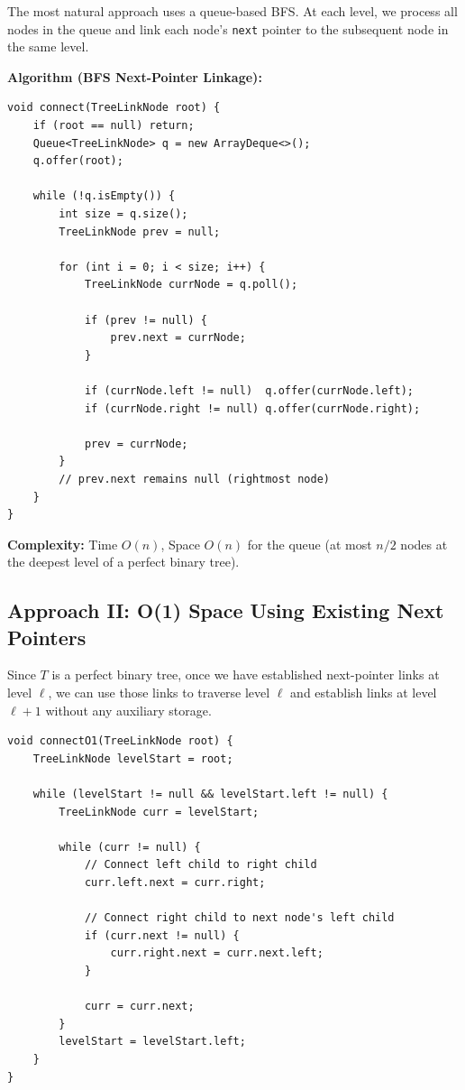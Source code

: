\documentclass[10pt,journal,compsoc,onecolumn]{IEEEtran}
\begin{document}
The most natural approach uses a queue-based BFS. At each level, we process all nodes in the queue and link each node's \texttt{next} pointer to the subsequent node in the same level.

\textbf{Algorithm (BFS Next-Pointer Linkage):}

\begin{verbatim}
void connect(TreeLinkNode root) {
    if (root == null) return;
    Queue<TreeLinkNode> q = new ArrayDeque<>();
    q.offer(root);

    while (!q.isEmpty()) {
        int size = q.size();
        TreeLinkNode prev = null;

        for (int i = 0; i < size; i++) {
            TreeLinkNode currNode = q.poll();

            if (prev != null) {
                prev.next = currNode;
            }

            if (currNode.left != null)  q.offer(currNode.left);
            if (currNode.right != null) q.offer(currNode.right);

            prev = currNode;
        }
        // prev.next remains null (rightmost node)
    }
}
\end{verbatim}

\textbf{Complexity:} Time $O(n)$, Space $O(n)$ for the queue (at most $n/2$ nodes at the deepest level of a perfect binary tree).

\subsection{Approach II: O(1) Space Using Existing Next Pointers}

Since $T$ is a perfect binary tree, once we have established next-pointer links at level $\ell$, we can use those links to traverse level $\ell$ and establish links at level $\ell + 1$ without any auxiliary storage.

\begin{verbatim}
void connectO1(TreeLinkNode root) {
    TreeLinkNode levelStart = root;

    while (levelStart != null && levelStart.left != null) {
        TreeLinkNode curr = levelStart;

        while (curr != null) {
            // Connect left child to right child
            curr.left.next = curr.right;

            // Connect right child to next node's left child
            if (curr.next != null) {
                curr.right.next = curr.next.left;
            }

            curr = curr.next;
        }
        levelStart = levelStart.left;
    }
}
\end{verbatim}
\end{document}
